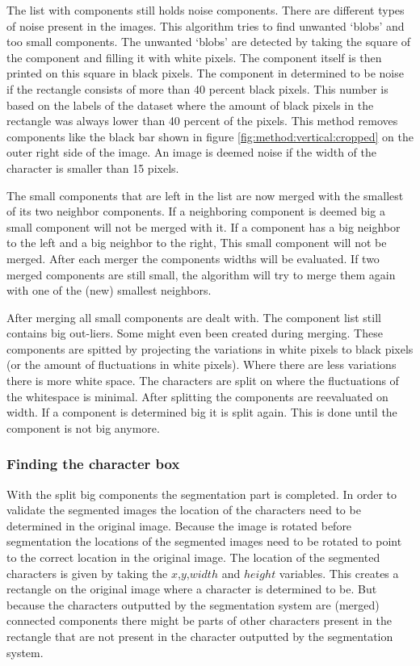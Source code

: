 The list with components still holds noise components. There are different types of noise present in the images. This algorithm tries to find unwanted `blobs' and too small components. The unwanted `blobs' are detected by taking the square of the component and filling it with white pixels. The component itself is then printed on this square in black pixels. The component in determined to be noise if the rectangle consists of more than 40 percent black pixels. This number is based on the labels of the dataset where the amount of black pixels in the rectangle was always lower than 40 percent of the pixels. This method removes components like the black bar shown in figure \ref{fig:method:vertical:cropped} on the outer right side of the image. An image is deemed noise if the width of the character is smaller than 15 pixels. 

The small components that are left in the list are now merged with the smallest of its two neighbor components. If a neighboring component is deemed big a small component will not be merged with it. If a component has a big neighbor to the left and a big neighbor to the right, This small component will not be merged. After each merger the components widths will be evaluated. If two merged components are still small, the algorithm will try to merge them again with one of the (new) smallest neighbors.

After merging all small components are dealt with. The component list still contains big out-liers. Some might even been created during merging. These components are spitted by projecting the variations in white pixels to black pixels (or the amount of fluctuations in white pixels). Where there are less variations there is more white space. The characters are split on where the fluctuations of the whitespace is minimal. After splitting the components are reevaluated on width. If a component is determined big it is split again. This is done until the component is not big anymore.


\subsubsection{Finding the character box}

With the split big components the segmentation part is completed. In order to validate the segmented images the location of the characters need to be determined in the original image. Because the image is rotated before segmentation the locations of the segmented images need to be rotated to point to the correct location in the original image. The location of the segmented characters is given by taking the $x$,$y$,$width$ and $height$ variables. This creates a rectangle on the original image where a character is determined to be. But because the characters outputted by the segmentation system are (merged) connected components there might be parts of other characters present in the rectangle that are not present in the character outputted by the segmentation system.

